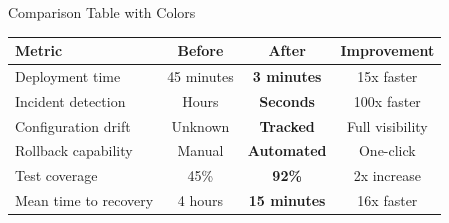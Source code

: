 \begin{frame}{Comparison Table with Colors}
  \begin{center}
    \tiny
    \begin{tabular}{|p{3.5cm}|c|c|c|}
      \hline
      \textbf{Metric} & \textbf{Before} & \textbf{After} & \textbf{Improvement} \\
      \hline
      \hline
      Deployment time & 45 minutes & \textbf{3 minutes} & \textcolor{accentgreen}{15x faster} \\
      \hline
      Incident detection & Hours & \textbf{Seconds} & \textcolor{accentgreen}{100x faster} \\
      \hline
      Configuration drift & Unknown & \textbf{Tracked} & \textcolor{accentgreen}{Full visibility} \\
      \hline
      Rollback capability & Manual & \textbf{Automated} & \textcolor{accentgreen}{One-click} \\
      \hline
      Test coverage & 45\% & \textbf{92\%} & \textcolor{accentgreen}{2x increase} \\
      \hline
      Mean time to recovery & 4 hours & \textbf{15 minutes} & \textcolor{accentgreen}{16x faster} \\
      \hline
    \end{tabular}
  \end{center}

  \vspace{0.3cm}


\end{frame}

